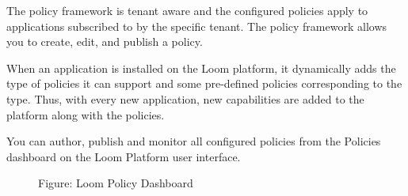 \documentclass[letterpaper,10pt,english]{sphinxmanual}
\begin{document}
\begin{savenotes}\sphinxatlongtablestart{}\sphinxatlongtableend\end{savenotes}

The policy framework is tenant aware and the configured policies apply to applications subscribed to by the specific tenant. The policy framework allows you to create, edit, and publish a policy.

When an application is installed on the Loom platform, it dynamically adds the type of policies it can support and some pre-defined policies corresponding to the type. Thus, with every new application, new capabilities are added to the platform along with the policies.

You can author, publish and monitor all configured policies from the Policies dashboard on the Loom Platform user interface.

\begin{figure}[htbp]
\centering
\capstart

\noindent{}
\caption{Figure: Loom Policy Dashboard}\label{\detokenize{loom_getting_started_guide:id42}}\end{figure}
\end{document}
